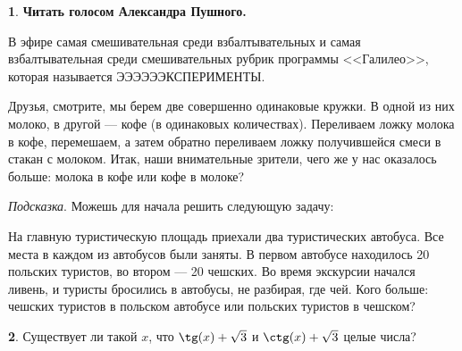\documentclass[14pt, a4paper]{extarticle}
\theoremstyle{definition}
\newtheorem{problem}{}
\theoremstyle{definition}
\theoremstyle{remark}
\numberwithin{equation}{section}
\begin{document}
\begin{problem}
    \textbf{Читать голосом Александра Пушного.}

    В эфире самая смешивательная среди взбалтывательных и самая
    взбалтывательная среди смешивательных рубрик программы <<Галилео>>, 
    которая называется ЭЭЭЭЭЭКСПЕРИМЕНТЫ.
    
    Друзья, смотрите, мы берем две совершенно одинаковые кружки.
    В одной из них молоко, в другой --- кофе (в одинаковых количествах). 
    Переливаем ложку молока в кофе, перемешаем, 
    а затем обратно переливаем ложку получившейся смеси в стакан с молоком. 
    Итак, наши внимательные зрители, чего же у нас оказалось больше:
    молока в кофе или кофе в молоке?

    \textit{Подсказка}. Можешь для начала решить следующую задачу:

    На главную туристическую площадь приехали два туристических 
    автобуса. Все места в каждом из автобусов были заняты. 
    В первом автобусе находилось 20 польских 
    туристов, во втором --- 20 чешских. Во время экскурсии 
    начался ливень, и туристы бросились в автобусы, не разбирая, где чей. 
    Кого больше: чешских туристов в польском автобусе или польских 
    туристов в чешском?
\end{problem}

\begin{problem}
    Существует ли такой $x$, что $\tg(x) + \sqrt{3}$ и 
    $\ctg(x) + \sqrt{3}$ целые числа?
\end{problem}
\end{document}
